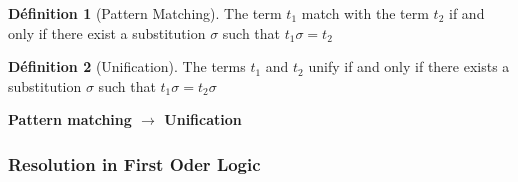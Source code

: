 \documentclass{article}
\theoremstyle{plain}%
\theoremstyle{definition}
\newtheorem{defn}{Définition}[section]
\theoremstyle{remark}
\begin{document}
\begin{defn}[Pattern Matching]
    The term $ t_1 $ match with the term $ t_2 $ if and only if there exist a substitution $ \sigma  $ such that $ t_1 \sigma = t_2 $ 
\end{defn}
\begin{defn}[Unification]
    The terms $ t_1 $ and $ t_2 $  unify if and only if there exists a substitution $ \sigma  $ such that $ t_1 \sigma = t_2 \sigma  $ 
\end{defn}
\textbf{Pattern matching $\rightarrow$ Unification}




\subsubsection{Resolution in First Oder Logic}
\end{document}
